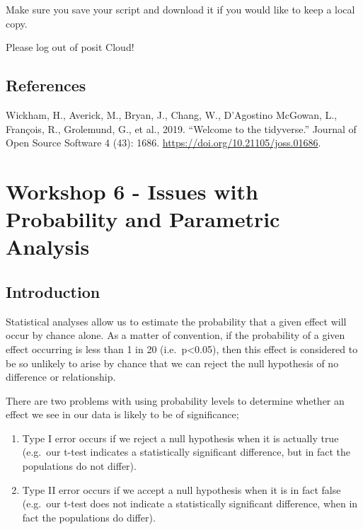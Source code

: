 \documentclass[
]{book}
\providecommand{\tightlist}{%
  \setlength{\itemsep}{0pt}\setlength{\parskip}{0pt}}
\begin{document}
Make sure you save your script and download it if you would like to keep a local copy.

Please log out of posit Cloud!

\section{References}\label{references-4}

Wickham, H., Averick, M., Bryan, J., Chang, W., D'Agostino McGowan, L., François, R., Grolemund, G., et al., 2019. ``Welcome to the tidyverse.'' Journal of Open Source Software 4 (43): 1686. \url{https://doi.org/10.21105/joss.01686}.

\chapter{Workshop 6 - Issues with Probability and Parametric Analysis}\label{workshop-6---issues-with-probability-and-parametric-analysis}

\section{Introduction}\label{introduction-5}

Statistical analyses allow us to estimate the probability that a given effect will occur by chance alone. As a matter of convention, if the probability of a given effect occurring is less than 1 in 20 (i.e.~p\textless0.05), then this effect is considered to be so unlikely to arise by chance that we can reject the null hypothesis of no difference or relationship.

There are two problems with using probability levels to determine whether an effect we see in our data is likely to be of significance;

\begin{enumerate}
\def\labelenumi{\arabic{enumi})}
\tightlist
\item
  Type I error occurs if we reject a null hypothesis when it is actually true (e.g.~our t-test indicates a statistically significant difference, but in fact the populations do not differ).
\item
  Type II error occurs if we accept a null hypothesis when it is in fact false (e.g.~our t-test does not indicate a statistically significant difference, when in fact the populations do differ).
\end{enumerate}
\end{document}
